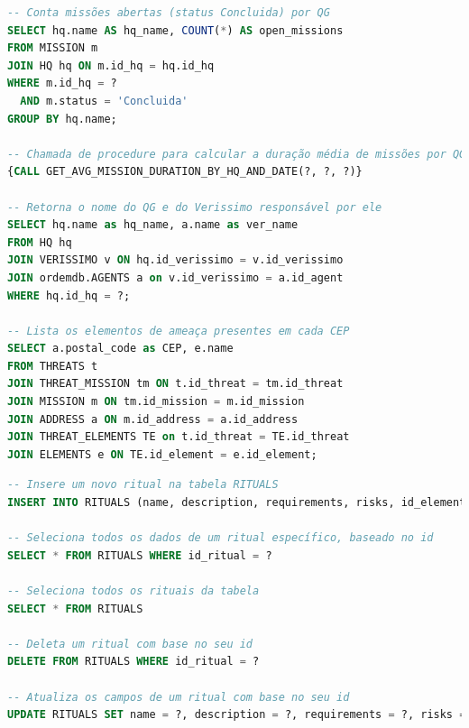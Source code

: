 \documentclass[12pt,a4paper]{report}
\begin{document}
\begin{lstlisting}[language=SQL, caption=Consultas feitas em QGDAO]
-- Conta missões abertas (status Concluida) por QG
SELECT hq.name AS hq_name, COUNT(*) AS open_missions
FROM MISSION m
JOIN HQ hq ON m.id_hq = hq.id_hq
WHERE m.id_hq = ?
  AND m.status = 'Concluida'
GROUP BY hq.name;

-- Chamada de procedure para calcular a duração média de missões por QG e data
{CALL GET_AVG_MISSION_DURATION_BY_HQ_AND_DATE(?, ?, ?)}

-- Retorna o nome do QG e do Verissimo responsável por ele
SELECT hq.name as hq_name, a.name as ver_name
FROM HQ hq
JOIN VERISSIMO v ON hq.id_verissimo = v.id_verissimo
JOIN ordemdb.AGENTS a on v.id_verissimo = a.id_agent
WHERE hq.id_hq = ?;

-- Lista os elementos de ameaça presentes em cada CEP
SELECT a.postal_code as CEP, e.name
FROM THREATS t
JOIN THREAT_MISSION tm ON t.id_threat = tm.id_threat
JOIN MISSION m ON tm.id_mission = m.id_mission
JOIN ADDRESS a ON m.id_address = a.id_address
JOIN THREAT_ELEMENTS TE on t.id_threat = TE.id_threat
JOIN ELEMENTS e ON TE.id_element = e.id_element;
\end{lstlisting}
\begin{lstlisting}[language=SQL, caption=Consultas feitas em RitualDAO]
-- Insere um novo ritual na tabela RITUALS
INSERT INTO RITUALS (name, description, requirements, risks, id_element) VALUES (?, ?, ?, ?, ?)

-- Seleciona todos os dados de um ritual específico, baseado no id
SELECT * FROM RITUALS WHERE id_ritual = ?

-- Seleciona todos os rituais da tabela
SELECT * FROM RITUALS

-- Deleta um ritual com base no seu id
DELETE FROM RITUALS WHERE id_ritual = ?

-- Atualiza os campos de um ritual com base no seu id
UPDATE RITUALS SET name = ?, description = ?, requirements = ?, risks = ?, id_element = ? WHERE id_ritual = ?
\end{lstlisting}
\end{document}
